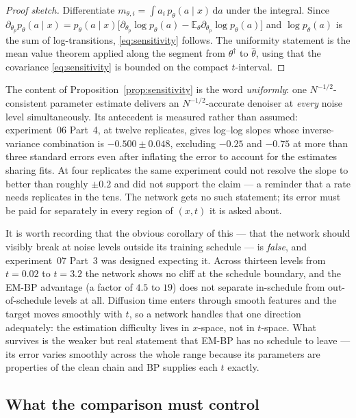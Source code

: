 \documentclass[11pt]{article}
\theoremstyle{remark}
\newcommand{\E}{\mathbb{E}}
\newcommand{\dd}{\,\mathrm{d}}
\begin{document}
\begin{proof}[Proof sketch]
Differentiate $m_{\theta,i} = \int a_i\, p_\theta(a\mid x)\dd a$ under the
integral. Since
$\partial_{\theta_p} p_\theta(a \mid x)
 = p_\theta(a\mid x)\bigl[\partial_{\theta_p}\log p_\theta(a)
   - \E_\theta \partial_{\theta_p}\log p_\theta(a)\bigr]$
and $\log p_\theta(a)$ is the sum of log-transitions, \eqref{eq:sensitivity}
follows. The uniformity statement is the mean value theorem applied along the
segment from $\theta^\dagger$ to $\hat\theta$, using that the covariance
\eqref{eq:sensitivity} is bounded on the compact $t$-interval.
\end{proof}

The content of Proposition~\ref{prop:sensitivity} is the word \emph{uniformly}:
one $N^{-1/2}$-consistent parameter estimate delivers an $N^{-1/2}$-accurate
denoiser at \emph{every} noise level simultaneously. Its antecedent is
measured rather than assumed: experiment~06 Part~4, at twelve replicates,
gives log--log slopes whose inverse-variance combination is
$-0.500 \pm 0.048$, excluding $-0.25$ and $-0.75$ at more than three standard
errors even after inflating the error to account for the estimates sharing
fits. At four replicates the same experiment could not resolve the slope to
better than roughly $\pm 0.2$ and did not support the claim --- a reminder that
a rate needs replicates in the tens. The network gets no such
statement; its error must be paid for separately in every region of $(x,t)$ it
is asked about.

It is worth recording that the obvious corollary of this --- that the network
should visibly break at noise levels outside its training schedule --- is
\emph{false}, and experiment~07 Part~3 was designed expecting it. Across
thirteen levels from $t = 0.02$ to $t = 3.2$ the network shows no cliff at the
schedule boundary, and the EM-BP advantage (a factor of $4.5$ to $19$) does not
separate in-schedule from out-of-schedule levels at all. Diffusion time enters
through smooth features and the target moves smoothly with $t$, so a network
handles that one direction adequately: the estimation difficulty lives in
$x$-space, not in $t$-space. What survives is the weaker but real statement
that EM-BP has no schedule to leave --- its error varies smoothly across the
whole range because its parameters are properties of the clean chain and BP
supplies each $t$ exactly.

\subsection{What the comparison must control}
\end{document}
